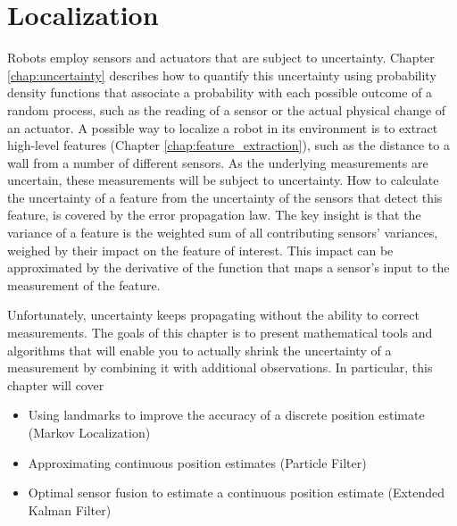 \chapter{Localization}\label{chap:localization}
Robots employ sensors and actuators that are subject to uncertainty. Chapter \ref{chap:uncertainty} describes how to quantify this uncertainty using probability density functions that associate a probability with each possible outcome of a random process, such as the reading of a sensor or the actual physical change of an actuator. 
A possible way to localize a robot in its environment is to extract high-level features (Chapter \ref{chap:feature_extraction}), such as the distance to a wall from a number of different sensors. As the underlying measurements are uncertain, these measurements will be subject to uncertainty. How to calculate the uncertainty of a feature from the uncertainty of the sensors that detect this feature, is covered by the error propagation law. The key insight is that the variance of a feature is the weighted sum of all contributing sensors' variances, weighed by their impact on the feature of interest. This impact can be approximated by the derivative of the function that maps a sensor's input to the measurement of the feature. 

 Unfortunately, uncertainty keeps propagating without the ability to correct measurements. The goals of this chapter is to present mathematical tools and algorithms that will enable you to actually shrink the uncertainty of a measurement by combining it with additional observations.  In particular, this chapter will cover
\begin{itemize}
\item Using landmarks to improve the accuracy of a discrete position estimate (Markov Localization)
\item Approximating continuous position estimates (Particle Filter)
\item Optimal sensor fusion to estimate a continuous position estimate (Extended Kalman Filter)
\end{itemize}

